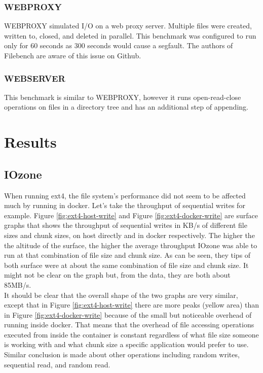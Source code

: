 \documentclass[letterpaper,twocolumn,10pt]{article}
\begin{document}
\subsubsection{WEBPROXY}
WEBPROXY simulated I/O on a web proxy server. Multiple files were created, written to, closed, and deleted in parallel. This benchmark was configured to run only for 60 seconds as 300 seconds would cause a segfault. The authors of Filebench are aware of this issue on Github.

\subsubsection{WEBSERVER}
This benchmark is similar to WEBPROXY, however it runs open-read-close operations on files in a directory tree and has an additional step of appending. 

\section{Results}
\subsection{IOzone}
When running ext4, the file system's performance did not seem to be affected much by running in docker. Let's take the throughput of 
sequential writes for example. Figure \ref{fig:ext4-host-write} and Figure \ref{fig:ext4-docker-write} are surface graphs that shows the throughput of 
sequential writes in KB/s of different file sizes and chunk sizes, on host directly and in docker respectively. The higher the the altitude of the 
surface, the higher the average throughput IOzone was able to run at that combination of file size and chunk size. As can be seen, they tips of both 
surface were at about the same combination of file size and chunk size. It might not be clear on the graph but, from the data, they are both about 85MB/s. \\

It should be clear that the overall shape of the two graphs are very similar, except that in Figure \ref{fig:ext4-host-write} there are more peaks 
(yellow area) than in Figure \ref{fig:ext4-docker-write} because of the small but noticeable overhead of running inside docker. That means that the 
overhead of file accessing operations executed 
from inside the container is constant regardless of what file size someone is working with and what chunk size a specific application would prefer to 
use. Similar conclusion is made about other operations including random writes, sequential read, and random read. \\
\end{document}
